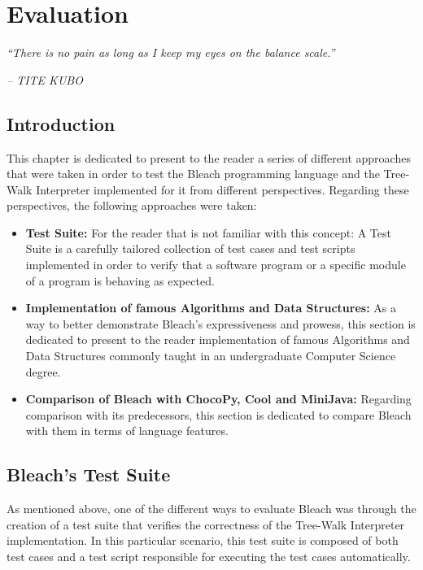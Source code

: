 \chapter{Evaluation} \label{cap:Resultados}

\begin{displayquote}
    \begin{center}
        \textit{``There is no pain as long as I keep my eyes on the balance scale.''}
    \end{center}
\end{displayquote}

\begin{flushright}
   \textit{-- TITE KUBO}
\end{flushright}

\section{Introduction}
This chapter is dedicated to present to the reader a series of different approaches that were taken in order to test the Bleach programming language and the Tree-Walk Interpreter implemented for it from different perspectives. Regarding these perspectives, the following approaches were taken:
\begin{itemize}
    \item \textbf{Test Suite:} For the reader that is not familiar with this concept: A Test Suite is a carefully tailored collection of test cases and test scripts implemented in order to verify that a software program or a specific module of a program is behaving as expected.
    
    \item \textbf{Implementation of famous Algorithms and Data Structures:} As a way to better demonstrate Bleach's expressiveness and prowess, this section is dedicated to present to the reader implementation of famous Algorithms and Data Structures commonly taught in an undergraduate Computer Science degree.
    
    \item \textbf{Comparison of Bleach with ChocoPy, Cool and MiniJava:} Regarding comparison with its predecessors, this section is dedicated to compare Bleach with them in terms of language features.
\end{itemize}


\section{Bleach's Test Suite}
As mentioned above, one of the different ways to evaluate Bleach was through the creation of a test suite that verifies the correctness of the Tree-Walk Interpreter implementation. In this particular scenario, this test suite is composed of both test cases and a test script responsible for executing the test cases automatically.

